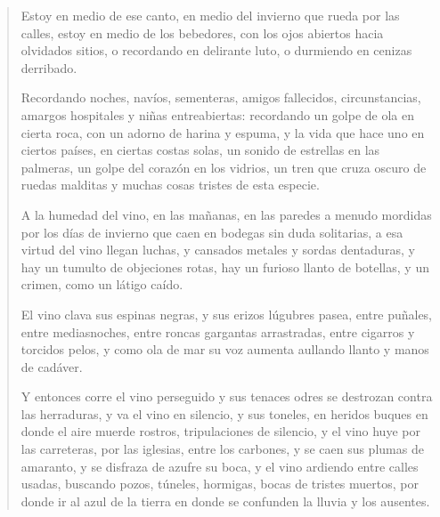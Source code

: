\documentclass[12pt]{article}
\begin{document}
\begin{verse}
Estoy en medio de ese canto, en medio  
del invierno que rueda por las calles,  
estoy en medio de los bebedores,  
con los ojos abiertos hacia olvidados sitios,  
o recordando en delirante luto,  
o durmiendo en cenizas derribado.  
	
Recordando noches, navíos, sementeras,  
amigos fallecidos, circunstancias,  
amargos hospitales y niñas entreabiertas:  
recordando un golpe de ola en cierta roca,  
con un adorno de harina y espuma,  
y la vida que hace uno en ciertos países,  
en ciertas costas solas,  
un sonido de estrellas en las palmeras,  
un golpe del corazón en los vidrios,  
un tren que cruza oscuro de ruedas malditas  
y muchas cosas tristes de esta especie.  
	
A la humedad del vino, en las mañanas,  
en las paredes a menudo mordidas por los días de invierno  
que caen en bodegas sin duda solitarias,  
a esa virtud del vino llegan luchas,  
y cansados metales y sordas dentaduras,  
y hay un tumulto de objeciones rotas,  
hay un furioso llanto de botellas,  
y un crimen, como un látigo caído.  
	
El vino clava sus espinas negras,  
y sus erizos lúgubres pasea,  
entre puñales, entre mediasnoches,  
entre roncas gargantas arrastradas,  
entre cigarros y torcidos pelos,  
y como ola de mar su voz aumenta  
aullando llanto y manos de cadáver.  
	
Y entonces corre el vino perseguido  
y sus tenaces odres se destrozan  
contra las herraduras, y va el vino en silencio,  
y sus toneles, en heridos buques en donde el aire muerde  
rostros, tripulaciones de silencio,  
y el vino huye por las carreteras,  
por las iglesias, entre los carbones,  
y se caen sus plumas de amaranto,  
y se disfraza de azufre su boca,  
y el vino ardiendo entre calles usadas,  
buscando pozos, túneles, hormigas,  
bocas de tristes muertos,  
por donde ir al azul de la tierra  
en donde se confunden la lluvia y los ausentes.  

\end{verse}
\end{document}
